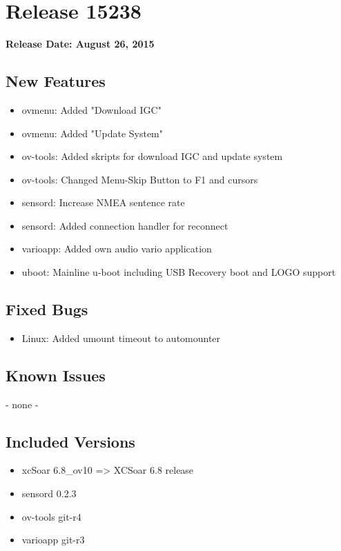 \chapter*{Release 15238}

\begin{flushleft}
	\textbf{Release Date: August 26, 2015}
\end{flushleft}

\section*{New Features}

\begin{itemize}
	\item ovmenu: Added "Download IGC"
	\item ovmenu: Added "Update System"
	\item ov-tools: Added skripts for download IGC and update system
	\item ov-tools: Changed Menu-Skip Button to F1 and cursors
	\item sensord: Increase NMEA sentence rate
	\item sensord: Added connection handler for reconnect
	\item varioapp: Added own audio vario application
	\item uboot: Mainline u-boot including USB Recovery boot and LOGO support
\end{itemize}

\section*{Fixed Bugs}
\begin{itemize}
	\item Linux: Added umount timeout to automounter
\end{itemize}

\section*{Known Issues}
	- none -

\section*{Included Versions}

\begin{itemize}
	\item xcSoar 6.8\_ov10 => XCSoar 6.8 release
	\item sensord 0.2.3
	\item ov-tools git-r4
	\item varioapp git-r3
\end{itemize}